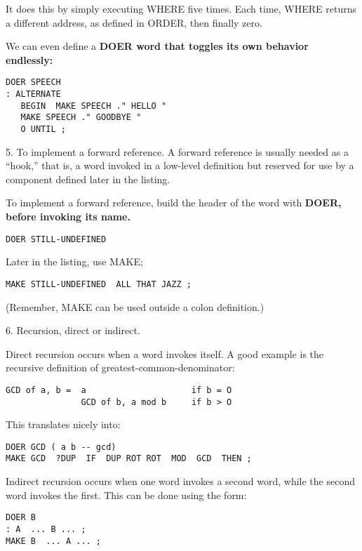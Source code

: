 It does this by simply executing WHERE five times. Each time, WHERE
returns a different address, as defined in ORDER, then finally zero.

We can even define a \bf{DOER} word that toggles its own behavior endlessly:

\begin{verbatim}
DOER SPEECH
: ALTERNATE
   BEGIN  MAKE SPEECH ." HELLO "
   MAKE SPEECH ." GOODBYE "
   O UNTIL ;
\end{verbatim}

5. To implement a forward reference. A forward reference is usually needed as
a ``hook,'' that is, a word invoked in a low-level definition but reserved for
use by a component defined later in the listing.

To implement a forward reference, build the header of the word with \bf{DOER},
before invoking its name.

\begin{verbatim}
DOER STILL-UNDEFINED
\end{verbatim}

Later in the listing, use MAKE;

\begin{verbatim}
MAKE STILL-UNDEFINED  ALL THAT JAZZ ;
\end{verbatim}

(Remember, MAKE can be used outside a colon definition.)

6. Recursion, direct or indirect.

Direct recursion occurs when a word invokes itself. A good example is the
recursive definition of greatest-common-denominator:

\begin{verbatim}
GCD of a, b =  a                     if b = O
               GCD of b, a mod b     if b > O
\end{verbatim}

This translates nicely into:

\begin{verbatim}
DOER GCD ( a b -- gcd)
MAKE GCD  ?DUP  IF  DUP ROT ROT  MOD  GCD  THEN ;
\end{verbatim}

Indirect recursion occurs when one word invokes a second word, while the
second word invokes the first. This can be done using the form:

\begin{verbatim}
DOER B
: A  ... B ... ;
MAKE B  ... A ... ;
\end{verbatim}

